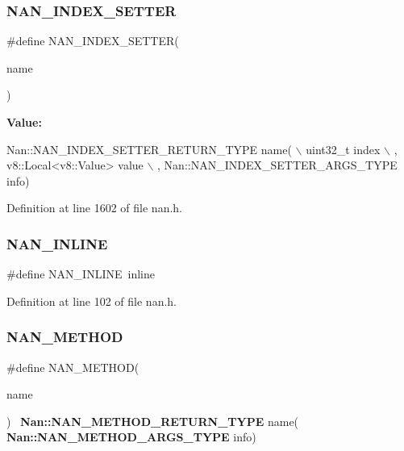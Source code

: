 \subsubsection{N\+A\+N\+\_\+\+I\+N\+D\+E\+X\+\_\+\+S\+E\+T\+T\+ER}
{\footnotesize\ttfamily \#define N\+A\+N\+\_\+\+I\+N\+D\+E\+X\+\_\+\+S\+E\+T\+T\+ER(\begin{DoxyParamCaption}\item[{}]{name }\end{DoxyParamCaption})}

{\bfseries Value\+:}
\begin{DoxyCode}
Nan::NAN_INDEX_SETTER_RETURN_TYPE name(                                    \(\backslash\)
        uint32\_t index                                                         \(\backslash\)
      , v8::Local<v8::Value> value                                             \(\backslash\)
      , Nan::NAN_INDEX_SETTER_ARGS_TYPE info)
\end{DoxyCode}


Definition at line 1602 of file nan.\+h.

\mbox{\label{nan_8h_ae80fa443c7d2d98c176e327b8b6a1b7d}} 
\subsubsection{N\+A\+N\+\_\+\+I\+N\+L\+I\+NE}
{\footnotesize\ttfamily \#define N\+A\+N\+\_\+\+I\+N\+L\+I\+NE~inline}



Definition at line 102 of file nan.\+h.

\mbox{\label{nan_8h_aa3050fb496467b50147c6bdc1cf0d521}} 
\subsubsection{N\+A\+N\+\_\+\+M\+E\+T\+H\+OD}
{\footnotesize\ttfamily \#define N\+A\+N\+\_\+\+M\+E\+T\+H\+OD(\begin{DoxyParamCaption}\item[{}]{name }\end{DoxyParamCaption})~\textbf{ Nan\+::\+N\+A\+N\+\_\+\+M\+E\+T\+H\+O\+D\+\_\+\+R\+E\+T\+U\+R\+N\+\_\+\+T\+Y\+PE} name(\textbf{ Nan\+::\+N\+A\+N\+\_\+\+M\+E\+T\+H\+O\+D\+\_\+\+A\+R\+G\+S\+\_\+\+T\+Y\+PE} info)}



